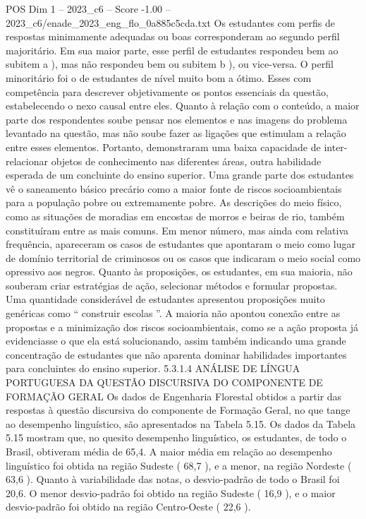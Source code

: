 \begin{textsample}{POS Dim 1 – 2023\_c6 – Score -1.00 – 2023\_c6/enade\_2023\_eng\_flo\_0a885c5cda.txt}
Os estudantes com perfis de respostas minimamente adequadas ou boas corresponderam ao segundo perfil majoritário.
Em sua maior parte, esse perfil de estudantes respondeu bem ao subitem a ), mas não respondeu bem ou subitem b ), ou vice-versa.
O perfil minoritário foi o de estudantes de nível muito bom a ótimo.
Esses com competência para descrever objetivamente os pontos essenciais da questão, estabelecendo o nexo causal entre eles.
Quanto à relação com o conteúdo, a maior parte dos respondentes soube pensar nos elementos e nas imagens do problema levantado na questão, mas não soube fazer as ligações que estimulam a relação entre esses elementos.
Portanto, demonstraram uma baixa capacidade de inter-relacionar objetos de conhecimento nas diferentes áreas, outra habilidade esperada de um concluinte do ensino superior.
Uma grande parte dos estudantes vê o saneamento básico precário como a maior fonte de riscos socioambientais para a população pobre ou extremamente pobre.
As descrições do meio físico, como as situações de moradias em encostas de morros e beiras de rio, também constituíram entre as mais comuns.
Em menor número, mas ainda com relativa frequência, apareceram os casos de estudantes que apontaram o meio como lugar de domínio territorial de criminosos ou os casos que indicaram o meio social como opressivo aos negros.
Quanto às proposições, os estudantes, em sua maioria, não souberam criar estratégias de ação, selecionar métodos e formular propostas.
Uma quantidade considerável de estudantes apresentou proposições muito genéricas como “ construir escolas ”.
A maioria não apontou conexão entre as propostas e a minimização dos riscos socioambientais, como se a ação proposta já evidenciasse o que ela está solucionando, assim também indicando uma grande concentração de estudantes que não aparenta dominar habilidades importantes para concluintes do ensino superior. 5.3.1.4 ANÁLISE DE LÍNGUA PORTUGUESA DA QUESTÃO DISCURSIVA DO COMPONENTE DE FORMAÇÃO GERAL Os dados de Engenharia Florestal obtidos a partir das respostas à questão discursiva do componente de Formação Geral, no que tange ao desempenho linguístico, são apresentados na Tabela 5.15.
Os dados da Tabela 5.15 mostram que, no quesito desempenho linguístico, os estudantes, de todo o Brasil, obtiveram média de 65,4.
A maior média em relação ao desempenho linguístico foi obtida na região Sudeste ( 68,7 ), e a menor, na região Nordeste ( 63,6 ).
Quanto à variabilidade das notas, o desvio-padrão de todo o Brasil foi 20,6.
O menor desvio-padrão foi obtido na região Sudeste ( 16,9 ), e o maior desvio-padrão foi obtido na região Centro-Oeste ( 22,6 ).

\end{textsample}
